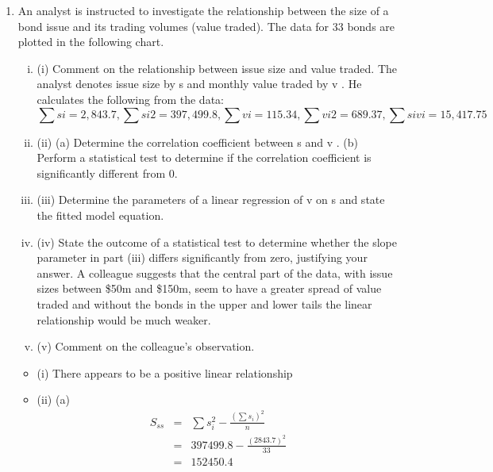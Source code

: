 \documentclass[a4paper,12pt]{article}
\begin{document}
\begin{enumerate}
\item An analyst is instructed to investigate the relationship between the size of a bond issue and its trading volumes (value traded). The data for 33 bonds are plotted in the following chart.

\begin{enumerate}[(i)]
\item (i)
Comment on the relationship between issue size and value traded. 
The analyst denotes issue size by s and monthly value traded by v . He calculates the following from the data:
\[\sum  s i = 2,843.7, \sum  s i 2 = 397, 499.8, \sum  v i = 115.34, \sum  v i 2 = 689.37, \sum  s i v i = 15, 417.75\]
\item (ii)
(a) Determine the correlation coefficient between s and v .
(b) Perform a statistical test to determine if the correlation coefficient is significantly different from 0.

\item
(iii) Determine the parameters of a linear regression of v on s and state the fitted model equation.

\item
(iv) State the outcome of a statistical test to determine whether the slope parameter in part (iii) differs significantly from zero, justifying your answer. A colleague suggests that the central part of the data, with issue sizes between \$50m
and \$150m, seem to have a greater spread of value traded and without the bonds in
the upper and lower tails the linear relationship would be much weaker.
\item
(v) Comment on the colleague’s observation.
\end{enumerate}

\newpage
\begin{itemize}
\item (i) There appears to be a positive linear relationship
\item (ii) (a)
\begin{eqnarray*}
S_{ss} &=& \sum s_i^2 - \frac{(\sum s_i)^2 }{n} \\&=& 397499.8 - \frac{(2843.7)^2}{33} \\
&=& 152450.4 \\
\end{eqnarray*}


\end{itemize}
\end{enumerate}
\end{document}
